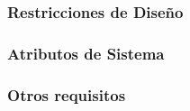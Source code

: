 \documentclass{article}
\begin{document}



        \subsubsection{Restricciones de Diseño}





        \subsubsection{Atributos de Sistema}












        \subsubsection{Otros requisitos}

\end{document}
